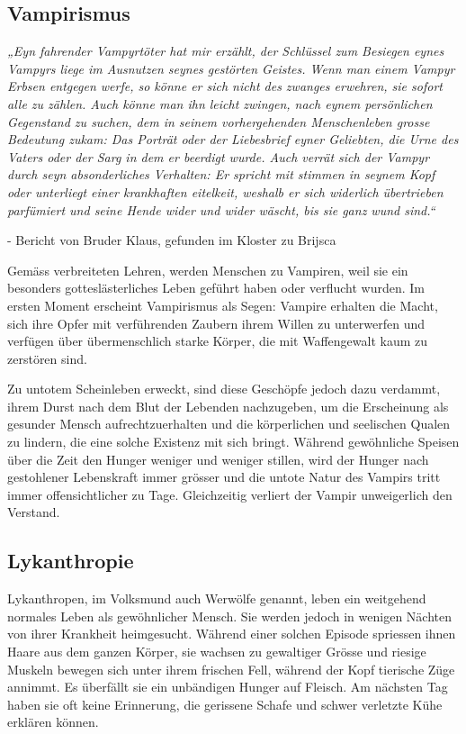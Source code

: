 \documentclass[10pt,twoside,twocolumn,openany]{book}
\begin{document}
\subsection{Vampirismus}
\begin{quotebox}
	\textit{„Eyn fahrender Vampyrtöter hat mir erzählt, der Schlüssel zum Besiegen eynes Vampyrs liege im Ausnutzen seynes gestörten Geistes. Wenn man einem Vampyr Erbsen entgegen werfe, so könne er sich nicht des zwanges erwehren, sie sofort alle zu zählen. Auch könne man ihn leicht zwingen, nach eynem  persönlichen Gegenstand zu suchen, dem in seinem vorhergehenden Menschenleben grosse Bedeutung zukam: Das Porträt oder der Liebesbrief eyner Geliebten, die Urne des Vaters oder der Sarg in dem er beerdigt wurde.
		Auch verrät sich der Vampyr durch seyn absonderliches Verhalten: Er spricht mit stimmen in seynem Kopf oder unterliegt einer krankhaften eitelkeit, weshalb er sich widerlich übertrieben parfümiert und seine Hende wider und wider wäscht, bis sie ganz wund sind.“}
	\begin{flushright}
		- Bericht von Bruder Klaus, gefunden im Kloster zu Brijsca
	\end{flushright}
\end{quotebox}
Gemäss verbreiteten Lehren, werden Menschen zu Vampiren, weil sie ein besonders gotteslästerliches Leben geführt haben oder verflucht wurden. Im ersten Moment erscheint Vampirismus als Segen: Vampire erhalten die Macht, sich ihre Opfer mit verführenden Zaubern ihrem Willen zu unterwerfen und verfügen über übermenschlich starke Körper, die mit Waffengewalt kaum zu zerstören sind.

Zu untotem Scheinleben erweckt, sind diese Geschöpfe jedoch dazu verdammt, ihrem Durst nach dem Blut der Lebenden nachzugeben, um die Erscheinung als gesunder Mensch aufrechtzuerhalten und die körperlichen und seelischen Qualen zu lindern, die eine solche Existenz mit sich bringt. Während gewöhnliche Speisen über die Zeit den Hunger weniger und weniger stillen, wird der Hunger nach gestohlener Lebenskraft immer grösser und die untote Natur des Vampirs tritt immer offensichtlicher zu Tage. Gleichzeitig verliert der Vampir unweigerlich den Verstand.


\subsection{Lykanthropie}
Lykanthropen, im Volksmund auch Werwölfe genannt, leben ein weitgehend normales Leben als gewöhnlicher Mensch. Sie werden jedoch in wenigen Nächten von ihrer Krankheit heimgesucht. Während einer solchen Episode spriessen ihnen Haare aus dem ganzen Körper, sie wachsen zu gewaltiger Grösse und riesige Muskeln bewegen sich unter ihrem frischen Fell, während der Kopf tierische Züge annimmt. Es überfällt sie ein unbändigen Hunger auf Fleisch. Am nächsten Tag haben sie oft keine Erinnerung, die gerissene Schafe und schwer verletzte Kühe erklären können.
\end{document}
